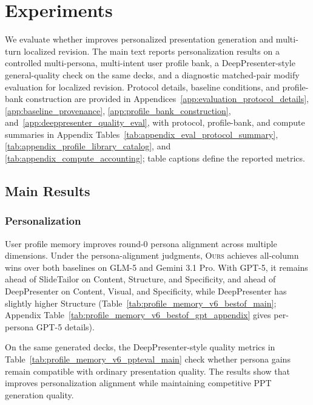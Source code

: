 \section{Experiments}

\vspace{-1.2ex}
We evaluate whether \methodname improves personalized presentation generation
and multi-turn localized revision. The main text reports personalization results
on a controlled multi-persona, multi-intent user profile bank, a
DeepPresenter-style general-quality check on the same decks, and a diagnostic
matched-pair modify evaluation for localized revision. Protocol details,
baseline conditions, and profile-bank construction are provided in
Appendices~\ref{app:evaluation_protocol_details},
\ref{app:baseline_provenance}, \ref{app:profile_bank_construction},
and~\ref{app:deeppresenter_quality_eval}, with protocol, profile-bank, and
compute summaries in Appendix Tables~\ref{tab:appendix_eval_protocol_summary},
\ref{tab:appendix_profile_library_catalog}, and
\ref{tab:appendix_compute_accounting}; table captions define the reported
metrics.

\subsection{Main Results}

\subsubsection{Personalization}



User profile memory improves round-0 persona alignment across multiple
dimensions. Under the persona-alignment judgments, \textsc{Ours} achieves
all-column wins over both baselines on GLM-5 and Gemini 3.1 Pro. With GPT-5, it
remains ahead of SlideTailor on Content, Structure, and Specificity, and ahead
of DeepPresenter on Content, Visual, and Specificity, while DeepPresenter has
slightly higher Structure (Table~\ref{tab:profile_memory_v6_bestof_main};
Appendix Table~\ref{tab:profile_memory_v6_bestof_gpt_appendix} gives
per-persona GPT-5 details).







On the same generated decks, the DeepPresenter-style quality metrics in
Table~\ref{tab:profile_memory_v6_ppteval_main} check whether persona gains
remain compatible with ordinary presentation quality. The results show that
\methodname improves personalization alignment while maintaining competitive
PPT generation quality.

